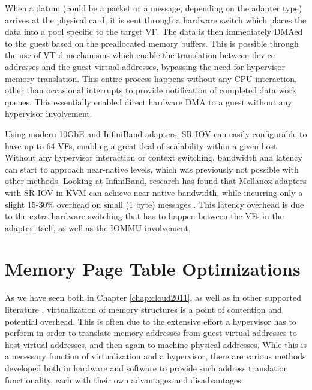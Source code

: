 When a datum (could be a packet or a message, depending on the adapter type) arrives at the physical card, it is sent through a hardware switch which places the data into a pool specific to the target VF. The data is then immediately DMAed to the guest based on the preallocated memory buffers. This is possible through the use of VT-d mechanisms which enable the translation between device addresses and the guest virtual addresses, bypassing the need for hypervisor memory translation. This entire process happens without any CPU interaction, other than occasional interrupts to provide notification of completed data work queues.   This essentially enabled direct hardware DMA to a guest without any hypervisor involvement.
 
Using modern 10GbE and InfiniBand adapters, SR-IOV can easily configurable to have up to 64 VFs, enabling a great deal of scalability within a given host.  Without any hypervisor interaction or context switching, bandwidth and latency can start to approach near-native levels, which was previously not possible with other methods. Looking at InfiniBand, research has found that Mellanox adapters with SR-IOV in KVM can achieve near-native bandwidth, while incurring only a slight 15-30\% overhead on small (1 byte) messages \cite{Musleh2014cloud, jose2013sr}. This latency overhead is due to the extra hardware switching that has to happen between the VFs in the adapter itself, as well as the IOMMU involvement.   

 

 

\section{Memory Page Table Optimizations}

As we have seen both in Chapter \ref{chap:cloud2011}, as well as in other supported literature \cite{MagellanFinal}, virtualization of memory structures is a point of contention and potential overhead. This is often due to the extensive effort a hypervisor has to perform in order to translate memory addresses from guest-virtual addresses to host-virtual addresses, and then again to machine-physical addresses.  Whle this is a necessary function of virtualization and a hypervisor, there are various methods developed both in hardware and software to provide such address translation functionality, each with their own advantages and disadvantages. 

